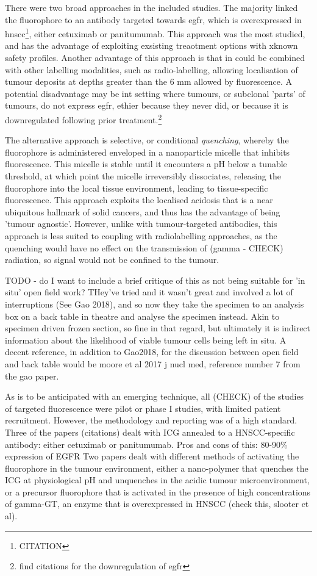 There were two broad approaches in the included studies. 
The majority linked the fluorophore to an antibody targeted towards \gls{egfr}, which is overexpressed in \gls{hnscc}\footnote{CITATION}, either cetuximab or panitumumab.
This approach was the most studied, and has the advantage of exploiting exsisting treaotment options with xknown safety profiles.
Another advantage of this approach is that in could be combined with other labelling modalities, such as radio-labelling, allowing localisation of tumour deposits at depths greater than the 6 mm allowed by fluorescence.
A potential disadvantage  may be int setting where tumours, or subclonal 'parts' of tumours, do not express \gls{egfr}, ethier because they never did, or because it is downregulated following prior treatment.\footnote{find citations for the downregulation of egfr}

The alternative approach is selective, or conditional \textit{quenching}, whereby the fluorophore is administered enveloped in a nanoparticle micelle that inhibits fluorescence.
This micelle is stable until it encounters a pH below a tunable threshold, at which point the micelle irreversibly dissociates, releasing the fluorophore into the local tissue environment, leading to tissue-specific fluorescence.
This approach exploits the localised acidosis that is a near ubiquitous hallmark of solid cancers, and thus has the advantage of being 'tumour agnostic'.
However, unlike with tumour-targeted antibodies, this approach is less suited to coupling with radiolabelling approaches, as the quenching would have no effect on the transmission of (gamma - CHECK) radiation, so signal would not be confined to the tumour.

TODO - do I want to include a brief critique of this as not being suitable for 'in situ' open field work? 
THey've tried and it wasn't great and involved a lot of interruptions (See Gao 2018), and so now they take the specimen to an analysis box on a back table in theatre and analyse the specimen instead. 
Akin to specimen driven frozen section, so fine in that regard, but ultimately it is indirect information about the likelihood of viable tumour cells being left in situ.
A decent reference, in addition to Gao2018, for the discussion between open field and back table would be moore et al 2017 j nucl med, reference number 7 from the gao paper.

As is to be anticipated with an emerging technique, all (CHECK) of the studies of targeted fluorescence were pilot or phase I studies, with limited patient recruitment. However, the methodology and reporting was of a high standard.
Three of the papers (citations) dealt with ICG annealed to a HNSCC-specific antibody: either cetuximab or panitumumab.
Pros and cons of this: 80-90\% expression of EGFR
Two papers dealt with different methods of activating the fluorophore in the tumour environment, either a nano-polymer that quenches the ICG at physiological pH and unquenches in the acidic tumour microenvironment, or a precursor fluorophore that is activated in the presence of high concentrations of gamma-GT, an enzyme that is overexpressed in HNSCC (check this, slooter et al).

